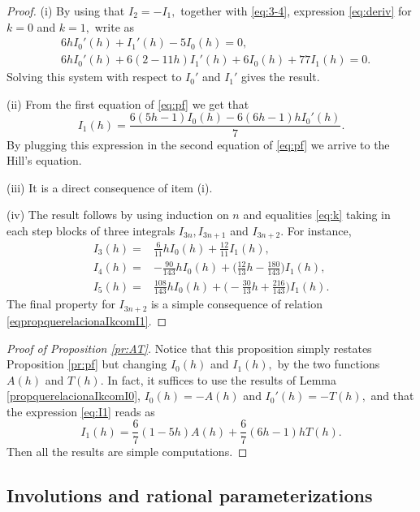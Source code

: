 \documentclass[12pt,a4paper,reqno]{amsart}
\begin{document}
\begin{proof} (i) By using that $I_2=-I_1,$ together with
\eqref{eq:3-4}, expression \eqref{eq:deriv} for $k=0$ and $k=1,$
write as
\begin{align*}
&6hI_0'(h)+I_1'(h)-5I_0(h)=0,\\
&6hI_0'(h)+6(2-11h)I_1'(h)+6I_0(h)+77I_1(h)=0.
\end{align*}
Solving this system with respect to $I_0'$ and $I_1'$ gives the
result.

(ii) From the first equation of \eqref{eq:pf} we get that
\begin{equation}\label{eq:I1}
I_1(h)=\frac{6(5h-1)I_0(h)-6(6h-1)h I_0'(h)}{7}.
\end{equation}
By plugging this expression in the second equation of \eqref{eq:pf}
we arrive to the Hill's equation.

(iii) It is a direct consequence of item (i).

(iv) The result follows by using induction on $n$ and equalities
\eqref{eq:k} taking in each step blocks of three integrals
$I_{3n},I_{3n+1}$ and $I_{3n+2}.$  For instance,
\begin{align*}
I_3(h)=&\frac{6}{11}hI_0(h)+\frac{12}{11} I_1(h), \\
 I_4(h)=&-\frac{90}{143}hI_0(h)+\Big(\frac{12}{13}h-\frac{180}{143}\Big)
 I_1(h),\\
 I_5(h)=&\frac{108}{143}hI_0(h)+\Big(-\frac{30}{13}h+\frac{216}{143}\Big)
 I_1(h).
\end{align*}
The final property for $I_{3n+2}$ is a simple consequence of
relation \eqref{eqpropquerelacionaIkcomI1}.
\end{proof}

\begin{proof}[Proof of Proposition \ref{pr:AT}]
Notice that this proposition simply restates Proposition \ref{pr:pf}
but changing $I_0(h)$ and $I_1(h),$ by the two functions  $A(h)$ and
$T(h).$ In fact, it suffices to use the results of Lemma
\ref{propquerelacionaIkcomI0},  $I_0(h)=-A(h)$ and $I_0'(h)=-T(h),$
and that the expression \eqref{eq:I1} reads as
\begin{equation}\label{eq:quo}I_1(h)=\frac 6 7(1-5h)A(h)+\frac 6 7(6h-1)h T(h).\end{equation} Then
all the results are simple computations.
\end{proof}






\subsection{Involutions and rational
parameterizations}\label{ss:param}
\end{document}
